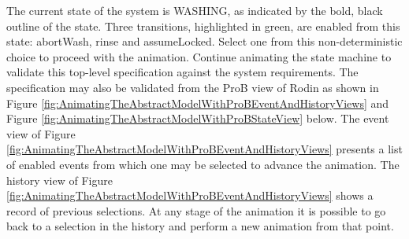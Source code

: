 The current state of the system is WASHING, as indicated by the bold, black outline of the state. Three transitions, highlighted in green, are enabled from this state: abortWash, rinse and assumeLocked. Select one from this non-deterministic choice to proceed with the animation. Continue animating the state machine to validate this top-level specification against the system requirements.
The specification may also be validated from the ProB view of Rodin as shown in Figure \ref{fig:AnimatingTheAbstractModelWithProBEventAndHistoryViews} and Figure \ref{fig:AnimatingTheAbstractModelWithProBStateView} below. The event view of Figure  \ref{fig:AnimatingTheAbstractModelWithProBEventAndHistoryViews} presents a list of enabled events from which one may be selected to advance the animation. The history view of Figure  \ref{fig:AnimatingTheAbstractModelWithProBEventAndHistoryViews} shows a record of previous selections. At any stage of the animation it is possible to go back to a selection in the history and perform a new animation from that point.
 
